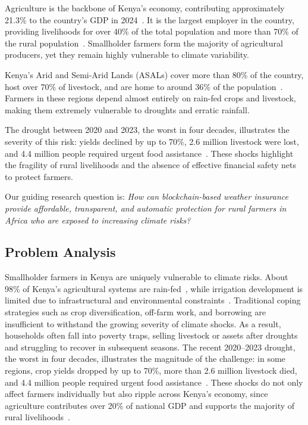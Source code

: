 \documentclass[11pt,a4paper]{article}
\begin{document}
	Agriculture is the backbone of Kenya’s economy, contributing approximately 21.3\% to the country’s GDP in 2024~\parencite{WorldBank2024}.
	It is the largest employer in the country, providing livelihoods for over 40\% of the total population and more than 70\% of the rural population~\parencite{FAO2024}.
	Smallholder farmers form the majority of agricultural producers, yet they remain highly vulnerable to climate variability.

	Kenya’s Arid and Semi-Arid Lands (ASALs) cover more than 80\% of the country, host over 70\% of livestock, and are home to around 36\% of the population~\parencite{IUCN2021,NDMA2021,UNEPDHI2021}.
	Farmers in these regions depend almost entirely on rain-fed crops and livestock, making them extremely vulnerable to droughts and erratic rainfall.

	The drought between 2020 and 2023, the worst in four decades, illustrates the severity of this risk: yields declined by up to 70\%, 2.6 million livestock were lost, and 4.4 million people required urgent food assistance~\parencite{TheStar2024,NDMA2024}.
	These shocks highlight the fragility of rural livelihoods and the absence of effective financial safety nets to protect farmers.

	Our guiding research question is: \emph{How can blockchain-based weather insurance provide affordable, transparent, and automatic protection for rural farmers in Africa who are exposed to increasing climate risks?}

	\subsection{Problem Analysis}\label{subsec:problem-analysis}
	Smallholder farmers in Kenya are uniquely vulnerable to climate risks.
	About 98\% of Kenya’s agricultural systems are rain-fed~\parencite{GoK2017}, while irrigation development is limited due to infrastructural and environmental constraints~\parencite{WairimuND}.
	Traditional coping strategies such as crop diversification, off-farm work, and borrowing are insufficient to withstand the growing severity of climate shocks.
	As a result, households often fall into poverty traps, selling livestock or assets after droughts and struggling to recover in subsequent seasons.
	The recent 2020--2023 drought, the worst in four decades, illustrates the magnitude of the challenge: in some regions, crop yields dropped by up to 70\%, more than 2.6 million livestock died, and 4.4 million people required urgent food assistance~\parencite{OCHA2023,TheStar2024}.
	These shocks do not only affect farmers individually but also ripple across Kenya’s economy, since agriculture contributes over 20\% of national GDP and supports the majority of rural livelihoods~\parencite{WorldBank2024}.
\end{document}
